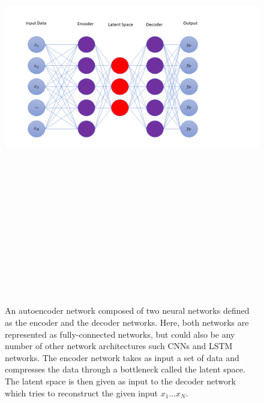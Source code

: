 \begin{figure}
    \centering
    \includegraphics[width=19cm,height=20cm,keepaspectratio]{figures/autoencoder_diagram.png}
    \caption{An autoencoder network composed of two neural networks defined as the encoder 
    and the decoder networks. Here, both networks are represented as fully-connected networks, but could also be any number of other network architectures such \ac{CNN}s and \ac{LSTM} networks. The encoder network takes as input a set of data and compresses the data  
    through a bottleneck called the latent space. The latent space is then given as input to the decoder network which tries to reconstruct the given input $x_1 ... x_N$.}
    \label{fig:autoencoder_diagram}
\end{figure}

